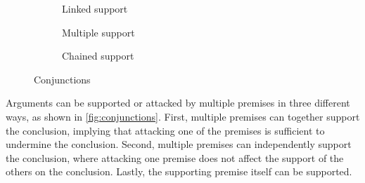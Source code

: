 \begin{figure}[ht!]
    \centering
    \begin{subfigure}[b]{0.3\textwidth}
        \centering
        \caption{Linked support}
        \label{fig:linked}
    \end{subfigure}
    \begin{subfigure}[b]{0.3\textwidth}
        \centering
        \caption{Multiple support}
        \label{fig:multiple}
    \end{subfigure}
    \begin{subfigure}[b]{.3\textwidth}
        \centering
        \caption{Chained support}
        \label{fig:chained}
    \end{subfigure}
    \caption{Conjunctions}
    \label{fig:conjunctions}
\end{figure}

Arguments can be supported or attacked by multiple premises in three different ways, as shown in \autoref{fig:conjunctions}. First, multiple premises can together support the conclusion, implying that attacking one of the premises is sufficient to undermine the conclusion. Second, multiple premises can independently support the conclusion, where attacking one premise does not affect the support of the others on the conclusion. Lastly, the supporting premise itself can be supported.

